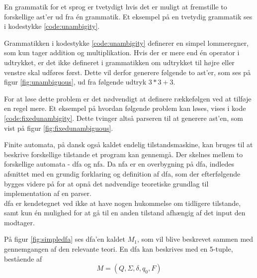 
\noindent En grammatik for et sprog er tvetydigt hvis det er muligt at fremstille to forskellige \gls{ast}'er ud fra én grammatik. Et eksempel på en tvetydig grammatik ses i kodestykke \ref{code:unambigity}.


\noindent Grammatikken i kodestykke \ref{code:unambigity} definerer en simpel lommeregner, som kun tager addition og multiplikation. Hvis der er mere end én operator i udtrykket, er det ikke defineret i grammatikken om udtrykket til højre eller venstre skal udføres først. Dette vil derfor generere følgende to \gls{ast}'er, som ses på figur \ref{fig:unambiguous}, ud fra følgende udtryk $3 * 3 + 3$.


\noindent For at løse dette problem er det nødvendigt at definere rækkefølgen ved at tilføje en regel mere. Et eksempel på hvordan følgende problem kan løses, vises i kode \ref{code:fixedunambigity}. Dette tvinger altså parseren til at generere \gls{ast}'en, som vist på figur \ref{fig:fixedunambiguous}.


Finite automata, på dansk også kaldet endelig tilstandsmaskine, kan bruges til at beskrive forskellige tilstande et program kan gennemgå. Der skelnes mellem to forskellige automata - \gls{dfa} og \gls{nfa}. Da \gls{nfa} er en overbygning på \gls{dfa}, indledes afsnittet med en grundig forklaring og definition af \gls{dfa}, som der efterfølgende bygges videre på for at opnå det nødvendige teoretiske grundlag til implementation af en parser.\\

\noindent \gls{dfa} er kendetegnet ved ikke at have nogen hukommelse om tidligere tilstande, samt kun én mulighed for at gå til en anden tilstand afhængig af det input den modtager.


\noindent På figur \ref{fig:simpledfa} ses \gls{dfa}'en kaldet $M_1$, som vil blive beskrevet sammen med gennemgangen af den relevante teori. En \gls{dfa} kan beskrives med en 5-tuple, bestående af \[M = (Q, \Sigma, \delta, q_0, F)\]


